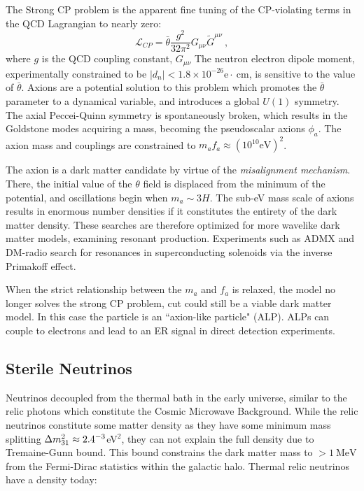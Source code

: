 The Strong CP problem is the apparent fine tuning of the CP-violating terms in the QCD Lagrangian to nearly zero\cite{chadha-day_axion_2022}:
\begin{equation}
    \mathcal{L}_{\textit{CP}} = \bar \theta \frac{g^2}{32 \pi ^2}G_{\mu \nu}\tilde G^{\mu \nu}~,
\end{equation}
\noindent
where $g$ is the QCD coupling constant, $G_{\mu \nu}$
The neutron electron dipole moment, experimentally constrained to be $|d_n| <1.8\times 10^{-26} \mathrm{e} \cdot \mathrm{~cm}$\cite{abel_measurement_2020}, is sensitive to the value of $\bar \theta$.
Axions are a potential solution to this problem which promotes the $\bar \theta$ parameter to a dynamical variable, and introduces a global $U(1)$ symmetry\cite{peccei_mathrmcp_1977}.
The axial Peccei-Quinn symmetry is spontaneously broken, which results in the Goldstone modes acquiring a mass, becoming the pseudoscalar axions $\phi_a$.
The axion mass and couplings are constrained to $m_a f_a \approx (10^{10} \text{eV})^2$.

The axion is a dark matter candidate by virtue of the \textit{misalignment mechanism}\cite{co_axion_2020}.
There, the initial value of the $\theta$ field is displaced from the minimum of the potential, and oscillations begin when $m_a\sim3H$.
The sub-eV mass scale of axions results in enormous number densities if it constitutes the entirety of the dark matter density.
These searches are therefore optimized for more wavelike dark matter models, examining resonant production.
Experiments such as ADMX\cite{khatiwada_axion_2021} and DM-radio\cite{silva-feaver_design_2016} search for resonances in superconducting solenoids via the inverse Primakoff effect.

When the strict relationship between the $m_a$ and $f_a$ is relaxed, the model no longer solves the strong CP problem, cut could still be a viable dark matter model.
In this case the particle is an ``axion-like particle" (ALP).
ALPs can couple to electrons and lead to an ER signal in direct detection experiments\cite{takahashi_xenon1t_2020}.

\subsection{Sterile Neutrinos}
Neutrinos decoupled from the thermal bath in the early universe, similar to the relic photons which constitute the Cosmic Microwave Background.
While the relic neutrinos constitute some matter density as they have some minimum mass splitting $\Delta m_{31}^2\approx 2.4\time10^{-3}$eV$^2$\cite{petcov_13_2012}, they can not explain the full density due to Tremaine-Gunn bound\cite{tremaine_dynamical_1979}.
This bound constrains the dark matter mass to $>1\mathrm{~MeV}$ from the Fermi-Dirac statistics within the galactic halo.
Thermal relic neutrinos have a density today\cite{giunti_fundamentals_2007}: 

